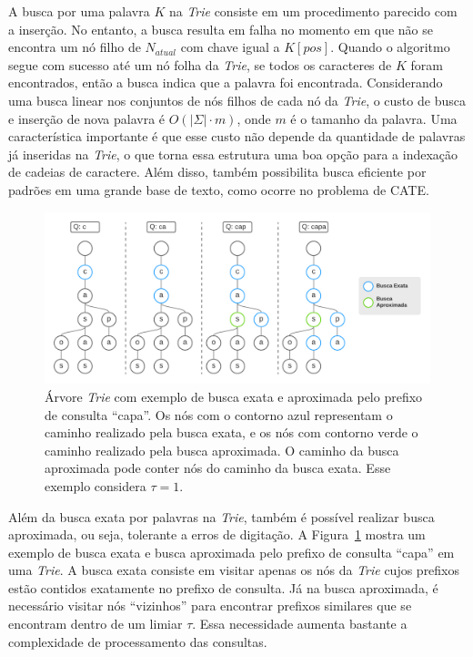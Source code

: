 A busca por uma palavra $K$ na \textit{Trie} consiste em um procedimento parecido com a inserção. No entanto, a busca resulta em falha no momento em que não se encontra um nó filho de $N_{atual}$ com chave igual a $K[pos]$. Quando o algoritmo segue com sucesso até um nó folha da \textit{Trie}, se todos os caracteres de $K$ foram encontrados, então a busca indica que a palavra foi encontrada. Considerando uma busca linear nos conjuntos de nós filhos de cada nó da \textit{Trie}, o custo de busca e inserção de nova palavra é $O(|\Sigma| \cdot m)$, onde $m$ é o tamanho da palavra. Uma característica importante é que esse custo não depende da quantidade de palavras já inseridas na \textit{Trie}, o que torna essa estrutura uma boa opção para a indexação de cadeias de caractere. Além disso, também possibilita busca eficiente por padrões em uma grande base de texto, como ocorre no problema de CATE.

\begin{figure}[ht]
    \centering
    \includegraphics[width=1\textwidth]{figures/trie_exact_and_approximate_search.png}
    \caption{Árvore \textit{Trie} com exemplo de busca exata e aproximada pelo prefixo de consulta ``capa''. Os nós com o contorno azul representam o caminho realizado pela busca exata, e os nós com contorno verde o caminho realizado pela busca aproximada. O caminho da busca aproximada pode conter nós do caminho da busca exata. Esse exemplo considera $\tau = 1$. }
    \label{fig:exact_and_approximate_search_trie}
\end{figure}

Além da busca exata por palavras na \textit{Trie}, também é possível realizar busca aproximada, ou seja, tolerante a erros de digitação. A Figura~\ref{fig:exact_and_approximate_search_trie} mostra um exemplo de busca exata e busca aproximada pelo prefixo de consulta ``capa'' em uma \textit{Trie}. A busca exata consiste em visitar apenas os nós da \textit{Trie} cujos prefixos estão contidos exatamente no prefixo de consulta. Já na busca aproximada, é necessário visitar nós ``vizinhos'' para encontrar prefixos similares que se encontram dentro de um limiar $\tau$. Essa necessidade aumenta bastante a complexidade de processamento das consultas. 

